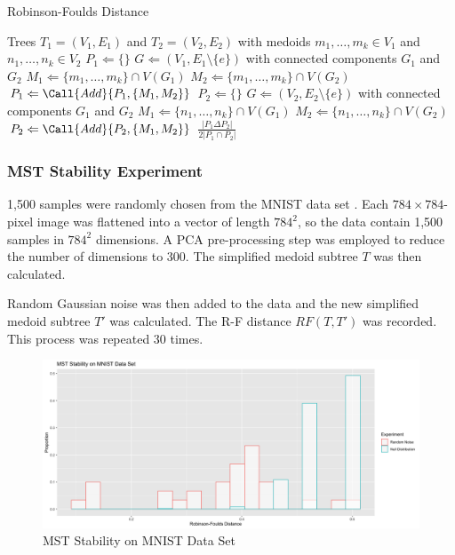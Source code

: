 \documentclass{article}
\begin{document}
\begin{algorithm}[H]
\caption{Robinson-Foulds Distance}\label{algo2}
\begin{algorithmic}[2]
\Require Trees $T_1 = (V_1,E_1)$ and $T_2 = (V_2, E_2)$ with medoids $m_1, \hdots, m_k \in V_1$ and $n_1, \hdots, n_k \in V_2$
\State $P_1 \Leftarrow \{\}$
	\State $G \Leftarrow (V_1, E_1 \setminus \{e\})$ with connected components $G_1$ and $G_2$
	\State $M_1 \Leftarrow \{m_1,\hdots,m_k\} \cap V(G_1)$
	\State $M_2 \Leftarrow \{m_1,\hdots,m_k\} \cap V(G_2)$
	\State $P_1 \Leftarrow \Call{Add}{P_1, \{M_1, M_2\}}$
\EndFor
\State $P_2 \Leftarrow \{\}$
	\State $G \Leftarrow (V_2, E_2 \setminus \{e\})$ with connected components $G_1$ and $G_2$
	\State $M_1 \Leftarrow \{n_1,\hdots,n_k\} \cap V(G_1)$
	\State $M_2 \Leftarrow \{n_1,\hdots,n_k\} \cap V(G_2)$
	\State $P_2 \Leftarrow \Call{Add}{P_2, \{M_1, M_2\}}$
\EndFor
\State \Output $\frac{\left|P_1 \Delta P_2 \right|}{2\left| P_1 \cap P_2 \right|}$
\end{algorithmic}
\end{algorithm}

\subsubsection{MST Stability Experiment}
1,500 samples were randomly chosen from the MNIST data set \cite{MNIST}. Each $784 \times 784$-pixel image was flattened into a vector of length $784^2$, so the data contain 1,500 samples in $784^2$ dimensions. A PCA pre-processing step was employed to reduce the number of dimensions to 300. The simplified medoid subtree $T$ was then calculated.

Random Gaussian noise was then added to the data and the new simplified medoid subtree $T'$ was calculated. The R-F distance $RF(T, T')$ was recorded. This process was repeated 30 times.

\renewcommand{\figurename}{Figure}
\renewcommand{\thefigure}{1}
\begin{figure}[!b]
\centering
\includegraphics[scale=0.3]{RF stability}
\caption{MST Stability on MNIST Data Set}
\end{figure}
\end{document}
